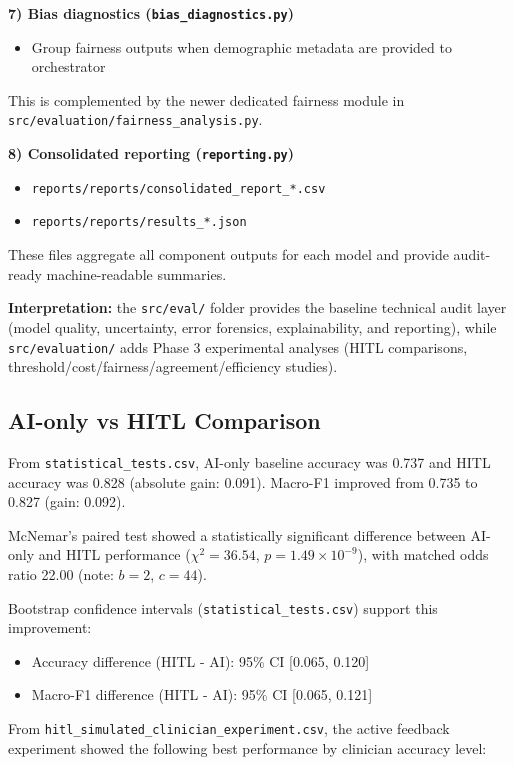 ﻿\documentclass[12pt]{article}
\begin{document}
\textbf{7) Bias diagnostics (\texttt{bias\_diagnostics.py})}
\begin{itemize}
    \item Group fairness outputs when demographic metadata are provided to orchestrator
\end{itemize}
This is complemented by the newer dedicated fairness module in \texttt{src/evaluation/fairness\_analysis.py}.

\textbf{8) Consolidated reporting (\texttt{reporting.py})}
\begin{itemize}
    \item \texttt{reports/reports/consolidated\_report\_*.csv}
    \item \texttt{reports/reports/results\_*.json}
\end{itemize}
These files aggregate all component outputs for each model and provide audit-ready machine-readable summaries.

\textbf{Interpretation:} the \texttt{src/eval/} folder provides the baseline technical audit layer (model quality, uncertainty, error forensics, explainability, and reporting), while \texttt{src/evaluation/} adds Phase 3 experimental analyses (HITL comparisons, threshold/cost/fairness/agreement/efficiency studies).

\subsection{AI-only vs HITL Comparison}
From \texttt{statistical\_tests.csv}, AI-only baseline accuracy was 0.737 and HITL accuracy was 0.828 (absolute gain: 0.091). Macro-F1 improved from 0.735 to 0.827 (gain: 0.092).

McNemar's paired test showed a statistically significant difference between AI-only and HITL performance ($\chi^2=36.54$, $p=1.49\times10^{-9}$), with matched odds ratio 22.00 (note: $b=2$, $c=44$).

Bootstrap confidence intervals (\texttt{statistical\_tests.csv}) support this improvement:
\begin{itemize}
    \item Accuracy difference (HITL - AI): 95\% CI [0.065, 0.120]
    \item Macro-F1 difference (HITL - AI): 95\% CI [0.065, 0.121]
\end{itemize}

From \texttt{hitl\_simulated\_clinician\_experiment.csv}, the active feedback experiment showed the following best performance by clinician accuracy level:
\end{document}
